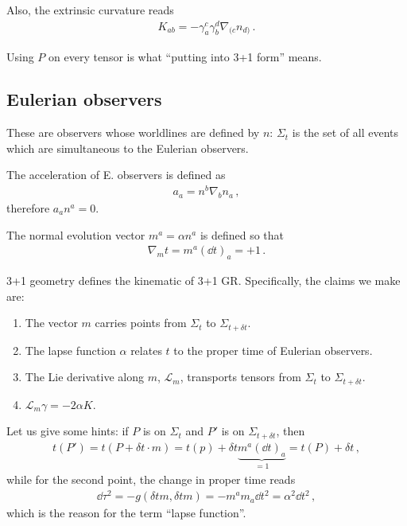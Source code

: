 \documentclass[main.tex]{subfiles}
\begin{document}
Also, the extrinsic curvature reads 
%
\begin{align}
K_{ab} = - \gamma_{a}^{c} \gamma^{d}_{b} \nabla_{(c} n_{d)}
\,.
\end{align}
%

Using \(P\) on every tensor is what ``putting into 3+1 form'' means. 

\subsection{Eulerian observers}

These are observers whose worldlines are defined by \(n\): \(\Sigma _t\) is the set of all events which are simultaneous to the Eulerian observers. 

\begin{definition}
The acceleration of E. observers is defined as 
%
\begin{align}
a_{a} = n^b \nabla_b n_a
\,,
\end{align}
%
therefore \(a_a n^a = 0\). 
\end{definition}

\begin{definition}
The normal evolution vector \(m^a = \alpha n^a\) is defined so that 
%
\begin{align}
\nabla_m t = m^a (\dd{t})_a = +1
\,.
\end{align}
\end{definition}

\begin{claim}
3+1 geometry defines the kinematic of 3+1 GR.
Specifically, the claims we make are:
\begin{enumerate}
    \item The vector \(m\) carries points from \(\Sigma _t\) to \(\Sigma _{t + \delta t}\). 
    \item The lapse function \(\alpha \) relates \(t\) to the proper time of Eulerian observers. 
    \item The Lie derivative along \(m\), \(\mathscr{L}_m\), transports tensors from \(\Sigma _t\) to \(\Sigma _{t + \delta t}\). 
    \item \(\mathscr{L}_m \gamma = - 2 \alpha K\). 
\end{enumerate}
\end{claim}

Let us give some hints: if \(P\) is on \(\Sigma _t\) and \(P'\) is on \(\Sigma _{t + \delta t}\), then 
%
\begin{align}
t(P') = t (P + \delta t \cdot m) = t(p) + \delta t \underbrace{m^a (\dd{t})_a }_{=1} = t(P) + \delta t
\,,
\end{align}
%
while for the second point, the change in proper time reads 
%
\begin{align}
\dd{\tau^2} = - g (\delta t m, \delta t m) = - m^a m_a \dd{t^2} = \alpha^2 \dd{t^2}
\,,
\end{align}
%
which is the reason for the term ``lapse function''. 
\end{document}
